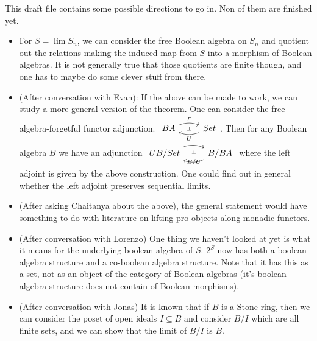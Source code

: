 This draft file contains some possible directions to go in. Non of them are finished yet. 



\begin{itemize}
  \item For $S = \lim S_n$, we can consider the free Boolean algebra on $S_n$ and quotient out the relations making the induced map from $S$ into a morphism of Boolean algebras. 
    It is not generally true that those quotients are finite though, and one has to maybe do some clever stuff from there. 
  \item (After conversation with Evan): If the above can be made to work, we can study a more general version of the theorem.  One can consider the free algebra-forgetful functor adjunction. $\begin{tikzcd}
      BA 
      \arrow[r, bend right = -20 ,"F"{name=2}]
      &
      Set 
      \arrow[l,"U"{name = 1},bend right = -20]
      \arrow[to=2, from=1,draw=none,"\dashv"{anchor=center,rotate=-90}]
    \end{tikzcd}$. Then for any Boolean algebra $B$ we have an adjunction 
$\begin{tikzcd}
      {UB/Set}
      \arrow[r,""{anchor=center,name = a},bend right = -20]
      &
      {B/BA}
      \arrow[l, bend right = -20 ,"B/U"{name=b,anchor=center}]
      \arrow[to=a, from=b,draw=none,"\dashv"{anchor=center,rotate=-90}]
    \end{tikzcd}$
    where the left adjoint is given by the above construction. One could find out in general whether the left adjoint preserves sequential limits. 
  \item (After asking Chaitanya about the above), the general statement would have something to do with literature on lifting pro-objects along monadic functors. 
  \item (After conversation with Lorenzo) One thing we haven't looked at yet is what it means for the underlying boolean algebra of $S$. $2^S$ now has both a boolean algebra structure and a co-boolean algebra structure. Note that it has this as a set, not as an object of the category of Boolean algebras (it's boolean algebra structure does not contain of Boolean morphisms). 
  \item (After conversation with Jonas) It is known that if $B$ is a Stone ring, then we can consider the poset of open ideals $I\subseteq B$ and consider $B/I$ which are all finite sets, and we can show that the limit of $B/I$ is $B$. 
\end{itemize}

